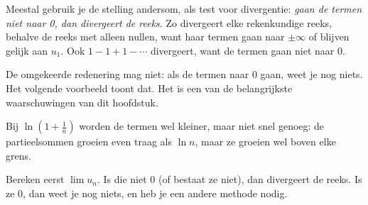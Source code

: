 Meestal gebruik je de stelling andersom, als test voor divergentie: \textit{gaan de termen niet naar 0, dan divergeert de reeks}. Zo divergeert elke rekenkundige reeks, behalve de reeks met alleen nullen, want haar termen gaan naar $\pm\infty$ of blijven gelijk aan $u_1$. Ook $1 - 1 + 1 - \cdots$ divergeert, want de termen gaan niet naar 0.


De omgekeerde redenering mag niet: als de termen naar 0 gaan, weet je nog niets. Het volgende voorbeeld toont dat. Het is een van de belangrijkste waarschuwingen van dit hoofdstuk.


Bij $\ln(1 + \tfrac1n)$ worden de termen wel kleiner, maar niet snel genoeg: de partieelsommen groeien even traag als $\ln n$, maar ze groeien wel boven elke grens.

\begin{werkwijze}
Bereken eerst $\lim u_n$. Is die niet 0 (of bestaat ze niet), dan divergeert de reeks. Is ze 0, dan weet je nog niets, en heb je een andere methode nodig.
\end{werkwijze}

